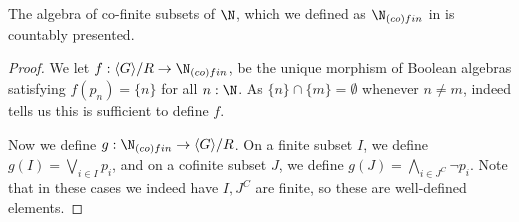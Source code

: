 \begin{remark}\label{N-co-fin-cp}
  The algebra of co-finite subsets of $\N$, which we defined as $\N_{(co)fin}$ in  is
  countably presented.
\end{remark}
\begin{proof}
  We let $f:\langle G \rangle / R \to \N_{(co)fin}$, be the unique morphism of Boolean algebras 
  satisfying $f(p_n) = \{n\}$ for all $n:\N$. As $\{n\} \cap \{m\} = \emptyset$ whenever $n\neq m$, 
   indeed tells us this is sufficient to define $f$. 

  Now we define $g:\N_{(co)fin} \to \langle G \rangle / R$. 
  On a finite subset $I$, we define $g(I) = \bigvee_{i\in I} p_i$, 
  and on a cofinite subset $J$, we define $g(J) = \bigwedge _{i \in J^C} \neg p_i$. 
  Note that in these cases we indeed have $I,J^C$ are finite, so these are well-defined elements. 


\end{proof}

